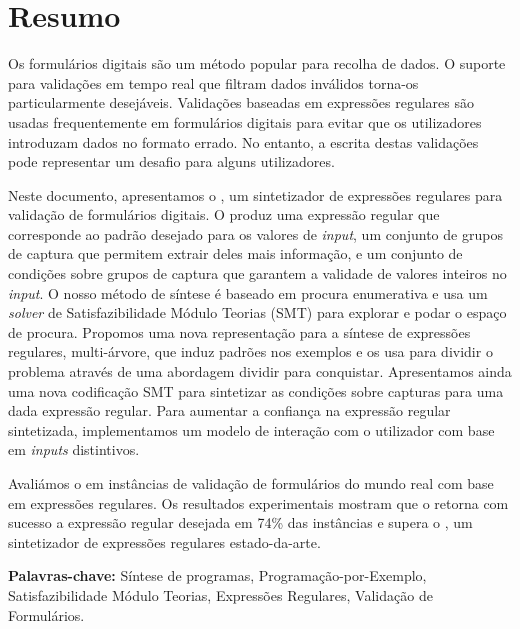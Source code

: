 \section*{Resumo}
Os formulários digitais são um método popular para recolha de dados.
O suporte para validações em tempo real que filtram dados inválidos torna-os particularmente desejáveis.
Validações baseadas em expressões regulares são usadas frequentemente em formulários digitais para evitar que os utilizadores introduzam dados no formato errado.
No entanto, a escrita destas validações pode representar um desafio para alguns utilizadores.

Neste documento, apresentamos o \Forest, um sintetizador de expressões regulares para validação de formulários digitais.
O \Forest produz uma expressão regular que corresponde ao padrão desejado para os valores de \textit{input},
um conjunto de grupos de captura que permitem extrair deles mais informação,
e
um conjunto de condições sobre grupos de captura que garantem a validade de valores inteiros no \textit{input}.
O nosso método de síntese é baseado em procura enumerativa e usa um \textit{solver} de Satisfazibilidade Módulo Teorias (SMT) para explorar e podar o espaço de procura.
Propomos uma nova representação para a síntese de expressões regulares, multi-árvore, que induz padrões nos exemplos e os usa para dividir o problema através de uma abordagem dividir para conquistar.
Apresentamos ainda uma nova codificação SMT para sintetizar as condições sobre capturas para uma dada expressão regular.
Para aumentar a confiança na expressão regular sintetizada, implementamos um modelo de interação com o utilizador com base em \textit{inputs} distintivos.

Avaliámos o \Forest{} em instâncias de validação de formulários do mundo real com base em expressões regulares. Os resultados experimentais mostram que o \Forest{} retorna com sucesso a expressão regular desejada em 74\% das instâncias e supera o \Regel, um sintetizador de expressões regulares estado-da-arte.

\vfill
\noindent
\textbf{\Large Palavras-chave:} Síntese de programas, Programação-por-Exemplo, Satisfazibilidade Módulo Teorias, Expressões Regulares, Validação de Formulários.

\cleardoublepage